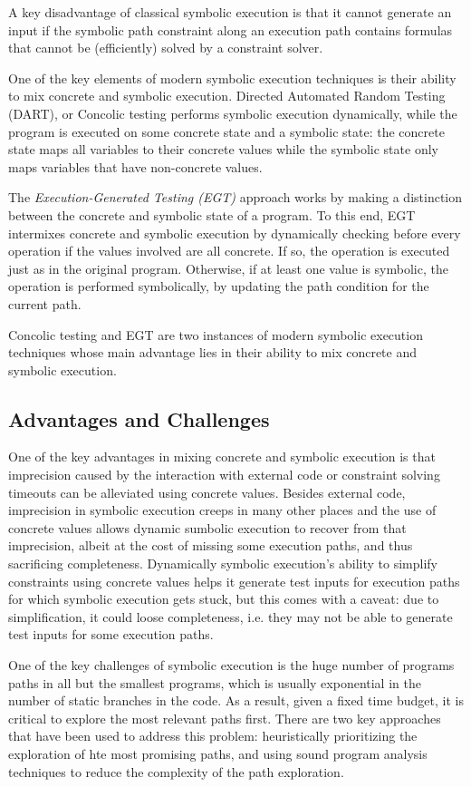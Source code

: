 A key disadvantage of classical symbolic execution is that it cannot generate an input if the symbolic path constraint along an execution path contains formulas that cannot be (efficiently) solved by a constraint solver.

One of the key elements of modern symbolic execution techniques is their ability to mix concrete and symbolic execution.
Directed Automated Random Testing (DART), or Concolic testing performs symbolic execution dynamically, while the program is executed on some concrete state and a symbolic state: the concrete state maps all variables to their concrete values while the symbolic state only maps variables that have non-concrete values.

The \textit{Execution-Generated Testing (EGT)} approach works by making a distinction between the concrete and symbolic state of a program. To this end, EGT intermixes concrete and symbolic execution by dynamically checking before every operation if the values involved are all concrete. If so, the operation is executed just as in the original program. Otherwise, if at least one value is symbolic, the operation is performed symbolically, by updating the path condition for the current path.

Concolic testing and EGT are two instances of modern symbolic execution techniques whose main advantage lies in their ability to mix concrete and symbolic execution.

\subsection{Advantages and Challenges}

One of the key advantages in mixing concrete and symbolic execution is that imprecision caused by the interaction with external code or constraint solving timeouts can be alleviated using concrete values.
Besides external code, imprecision in symbolic execution creeps in many other places and the use of concrete values allows dynamic sumbolic execution to recover from that imprecision, albeit at the cost of missing some execution paths, and thus sacrificing completeness. Dynamically symbolic execution's ability to simplify constraints using concrete values helps it generate test inputs for execution paths for which symbolic execution gets stuck, but this comes with a caveat: due to simplification, it could loose completeness, i.e. they may not be able to generate test inputs for some execution paths.

One of the key challenges of symbolic execution is the huge number of programs paths in all but the smallest programs, which is usually exponential in the number of static branches in the code. As a result, given a fixed time budget, it is critical to explore the most relevant paths first.
There are two key approaches that have been used to address this problem: heuristically prioritizing the exploration of hte most promising paths, and using sound program analysis techniques to reduce the complexity of the path exploration.

